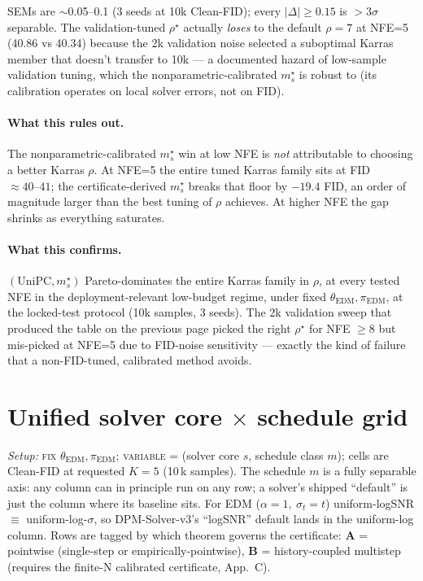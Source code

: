 \documentclass[11pt]{article}
\begin{document}
\noindent SEMs are \(\sim\)0.05--0.1 (3 seeds at 10k Clean-FID); every
\(|\Delta| \ge 0.15\) is \(>3\sigma\) separable. The validation-tuned
\(\rho^\star\) actually \emph{loses} to the default \(\rho{=}7\) at
NFE=5 (40.86 vs 40.34) because the 2k validation noise selected a
suboptimal Karras member that doesn't transfer to 10k --- a
documented hazard of low-sample validation tuning, which the
nonparametric-calibrated \(m_s^\star\) is robust to (its calibration
operates on local solver errors, not on FID).

\paragraph{What this rules out.} The nonparametric-calibrated
\(m_s^\star\) win at low NFE is \emph{not} attributable to choosing a
better Karras \(\rho\). At NFE=5 the entire tuned Karras family sits at
FID \(\approx 40\text{--}41\); the certificate-derived \(m_s^\star\)
breaks that floor by \(\mathbf{-19.4}\) FID, an order of magnitude
larger than the best tuning of \(\rho\) achieves. At higher NFE the
gap shrinks as everything saturates.

\paragraph{What this confirms.} \((\mathrm{UniPC}, m_s^\star)\)
Pareto-dominates the entire Karras family in \(\rho\), at every tested
NFE in the deployment-relevant low-budget regime, under fixed
\(\theta_{\mathrm{EDM}}, \pi_{\mathrm{EDM}}\), at the locked-test
protocol (10k samples, 3 seeds). The 2k validation sweep that produced
the table on the previous page picked the right \(\rho^\star\) for
NFE \(\ge 8\) but mis-picked at NFE=5 due to FID-noise sensitivity ---
exactly the kind of failure that a non-FID-tuned, calibrated method
avoids.

\section{Unified solver core \(\times\) schedule grid}
\label{sec:unified-grid}

\noindent\textit{Setup:} \textsc{fix} \(\theta_{\mathrm{EDM}},
\pi_{\mathrm{EDM}}\); \textsc{variable} = (solver core \(s\), schedule
class \(m\)); cells are Clean-FID at requested \(K{=}5\) (10\,k samples).
The schedule \(m\) is a fully separable axis: any column can in principle
run on any row; a solver's shipped ``default'' is just the column where
its baseline sits. For EDM (\(\alpha{=}1,\ \sigma_t{=}t\)) uniform-logSNR
\(\equiv\) uniform-log-\(\sigma\), so DPM-Solver-v3's ``logSNR'' default
lands in the uniform-log column. Rows are tagged by which theorem
governs the certificate: \textbf{A} = pointwise (single-step or
empirically-pointwise), \textbf{B} = history-coupled multistep (requires
the finite-N calibrated certificate, App.~C).
\end{document}
